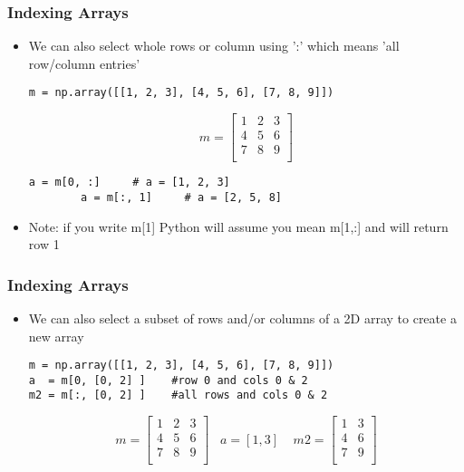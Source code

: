\documentclass[english,14pt]{beamer}
\begin{document}
\begin{frame}[fragile]
\frametitle{Indexing Arrays}
	\begin{itemize}
		\item We can also select whole rows or column using ':' which means 'all row/column entries'
\begin{lstlisting}[style=CStyle]		
m = np.array([[1, 2, 3], [4, 5, 6], [7, 8, 9]])
\end{lstlisting}
\[		
m = \left[ 
\begin{array}{ccc}
     1 & 2 & 3   \\
     4 & 5 & 6   \\
     7 & 8 & 9  \\     
\end{array} \right]  
\]
\begin{lstlisting}[style=CStyle]		
		a = m[0, :]     # a = [1, 2, 3]
		a = m[:, 1]     # a = [2, 5, 8]
\end{lstlisting}
\item Note: if you write m[1] Python will assume you mean m[1,:] and will return row 1
	\end{itemize}
\end{frame}



\begin{frame}[fragile]
\frametitle{Indexing Arrays}
	\begin{itemize}
		\item We can also select a subset of rows and/or columns of a 2D array to create a new array
\begin{lstlisting}[style=CStyle]	
m = np.array([[1, 2, 3], [4, 5, 6], [7, 8, 9]])
a  = m[0, [0, 2] ]    #row 0 and cols 0 & 2
m2 = m[:, [0, 2] ]    #all rows and cols 0 & 2
\end{lstlisting}

\[		
m = \left[ 
\begin{array}{ccc}
     1 & 2 & 3   \\
     4 & 5 & 6   \\
     7 & 8 & 9  \\     
\end{array} \right] 
\;\;\; a = [1, 3]
\;\;\;\; m2 = \left[ 
\begin{array}{cc}
     1  & 3   \\
     4  & 6   \\
     7  & 9  \\     
\end{array} \right] 
\]
	\end{itemize}
\end{frame}
\end{document}
